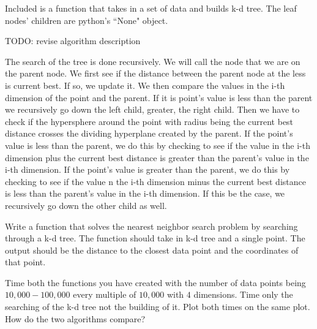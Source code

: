 Included is a function that takes in a set of data and builds k-d tree.
The leaf nodes' children are  python's ``None" object.

TODO: revise algorithm description

The search of the tree is done recursively.
We will call the node that we are on the parent node.
We first see if the distance between the parent node at the less is current best.
If so, we update it.
We then compare the values in the i-th dimension of the point and the parent.
If it is point's value is less than the parent we recursively go down the left child, greater, the right child.
Then we have to check if the hypersphere around the point with radius being the current best distance crosses the dividing hyperplane created by the parent.
If the point's value is less than the parent, we do this by checking to see if the value in the i-th dimension plus the current best distance is greater than the parent's value in the i-th dimension.
If the point's value is greater than the parent, we do this by checking to see if the value n the i-th dimension minus the current best distance is less than the parent's value in the i-th dimension.
If this be the case, we recursively go down the other child as well.

\begin{problem}
Write a function that solves the nearest neighbor search problem by searching through a k-d tree.
The function should take in k-d tree and a single point.
The output should be the distance to the closest data point and the coordinates of that point. 
\end{problem}

\begin{problem}
Time both the functions you have created with the number of data points being $10,000-100,000$ every multiple of $10,000$ with $4$ dimensions.
Time only the searching of the k-d tree not the building of it.
Plot both times on the same plot.
How do the two algorithms compare?
\end{problem}

